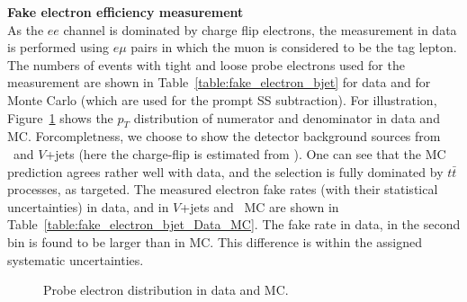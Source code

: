 \par{\bf Fake electron efficiency measurement\\}
As the $ee$ channel is dominated by charge flip electrons, the measurement in data is performed using $e\mu$ pairs 
in which the muon is considered to be the tag lepton. 
The numbers of events with tight and loose probe electrons used for the measurement are shown in Table~\ref{table:fake_electron_bjet} 
for data and for Monte Carlo (which are used for the prompt SS subtraction). 
For illustration, Figure~\ref{Fig:CR_fake_ele} shows the $p_T$ distribution of numerator and denominator in data and MC. 
Forcompletness, we choose to show the detector background sources from \ttbar\ and $V$+jets (here the charge-flip is estimated from \ttbar). 
One can see that the MC prediction agrees rather well with data, and the selection is fully dominated by $t\bar t$ processes, as targeted. 
The measured electron fake rates (with their statistical uncertainties) in data, and in $V$+jets and \ttbar\ MC are shown in Table~\ref{table:fake_electron_bjet_Data_MC}. 
The fake rate in data, in the second \pt bin is found to be larger than in MC. This difference is within the assigned systematic uncertainties. 

\begin{figure}[h!]
\centering
{}
\caption
{Probe electron \pt distribution in data and MC.}
\label{Fig:CR_fake_ele}
\end{figure}

